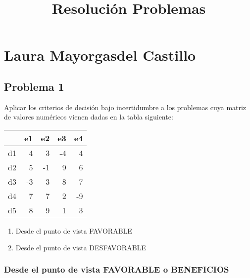 \documentclass[
]{article}
\title{Resolución Problemas}
\author{}
\date{\vspace{-2.5em}}
\providecommand{\tightlist}{%
  \setlength{\itemsep}{0pt}\setlength{\parskip}{0pt}}
\begin{document}
\maketitle

{
\setcounter{tocdepth}{5}
\tableofcontents
}
\newpage

\section{Laura Mayorgasdel Castillo}\label{laura-mayorgasdel-castillo}

\subsection{Problema 1}\label{problema-1}

Aplicar los criterios de decisión bajo incertidumbre a los problemas
cuya matriz de valores numéricos vienen dadas en la tabla siguiente:

\begin{longtable}[]{@{}lrrrr@{}}
\toprule\noalign{}
& e1 & e2 & e3 & e4 \\
\midrule\noalign{}
\endhead
\bottomrule\noalign{}
\endlastfoot
d1 & 4 & 3 & -4 & 4 \\
d2 & 5 & -1 & 9 & 6 \\
d3 & -3 & 3 & 8 & 7 \\
d4 & 7 & 7 & 2 & -9 \\
d5 & 8 & 9 & 1 & 3 \\
\end{longtable}

\begin{enumerate}
\def\labelenumi{\alph{enumi})}
\tightlist
\item
  Desde el punto de vista FAVORABLE
\item
  Desde el punto de vista DESFAVORABLE
\end{enumerate}

\subsubsection{Desde el punto de vista FAVORABLE o
BENEFICIOS}\label{desde-el-punto-de-vista-favorable-o-beneficios}
\end{document}
